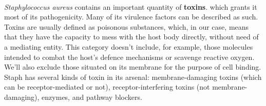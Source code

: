 \paragraph{}\emph{Staphylococcus aureus} contains an important quantity of \textbf{toxins}. which grants it most of its pathogenicity. Many of its virulence factors can be described as such. Toxins are usually defined as poisonous substances, which, in our case, means that they have the capacity to mess with the host body directly, without need of a mediating entity. This category doesn't include, for example, those molecules intended to combat the host's defence mechanisms or scavenge reactive oxygen. We'll also exclude those situated on its membrane for the purpose of cell binding. Staph has several kinds of toxin in its arsenal: membrane-damaging toxins (which can be receptor-mediated or not), receptor-interfering toxins (not membrane-damaging), enzymes, and pathway blockers.\newline
